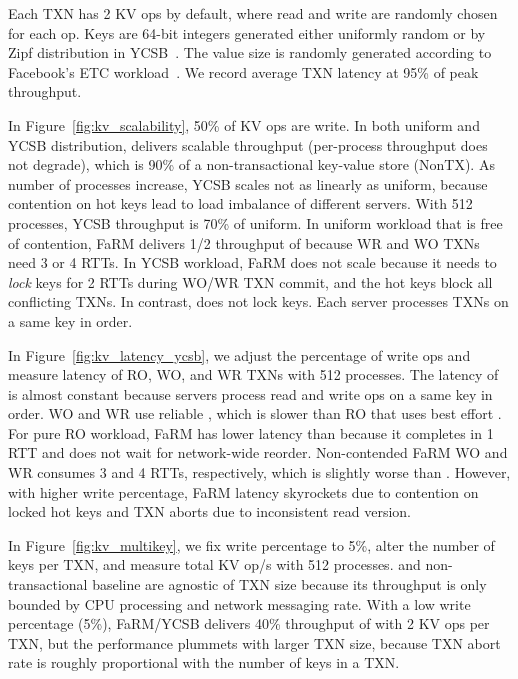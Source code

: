 Each TXN has 2 KV ops by default, where read and write are randomly chosen for each op.
Keys are 64-bit integers generated either uniformly random or by Zipf distribution in YCSB~\cite{cooper2010benchmarking}.
The value size is randomly generated according to Facebook's ETC workload~\cite{atikoglu2012workload}.
We record average TXN latency at 95\% of peak throughput.


In Figure~\ref{fig:kv_scalability}, 50\% of KV ops are write.
In both uniform and YCSB distribution, \sys{} delivers scalable throughput (per-process throughput does not degrade), which is 90\% of a non-transactional key-value store (NonTX).
As number of processes increase, YCSB scales not as linearly as uniform, because contention on hot keys lead to load imbalance of different servers.
With 512 processes, YCSB throughput is 70\% of uniform.
In uniform workload that is free of contention, FaRM delivers 1/2 throughput of \sys{} because WR and WO TXNs need 3 or 4 RTTs.
In YCSB workload, FaRM does not scale because it needs to \emph{lock} keys for 2 RTTs during WO/WR TXN commit, and the hot keys block all conflicting TXNs.
In contrast, \sys{} does not lock keys. Each server processes TXNs on a same key in order.

In Figure~\ref{fig:kv_latency_ycsb}, we adjust the percentage of write ops and measure latency of RO, WO, and WR TXNs with 512 processes.
The latency of \sys{} is almost constant because servers process read and write ops on a same key in order. WO and WR use reliable \sys{}, which is slower than RO that uses best effort \sys{}.
For pure RO workload, FaRM has lower latency than \sys{} because it completes in 1 RTT and does not wait for network-wide reorder.
Non-contended FaRM WO and WR consumes 3 and 4 RTTs, respectively, which is slightly worse than \sys{}.
However, with higher write percentage, FaRM latency skyrockets due to contention on locked hot keys and TXN aborts due to inconsistent read version.

In Figure~\ref{fig:kv_multikey}, we fix write percentage to 5\%, alter the number of keys per TXN, and measure total KV op/s with 512 processes.
\sys{} and non-transactional baseline are agnostic of TXN size because its throughput is only bounded by CPU processing and network messaging rate.
With a low write percentage (5\%), FaRM/YCSB delivers 40\% throughput of \sys{} with 2 KV ops per TXN, but the performance plummets with larger TXN size, because TXN abort rate is roughly proportional with the number of keys in a TXN.

